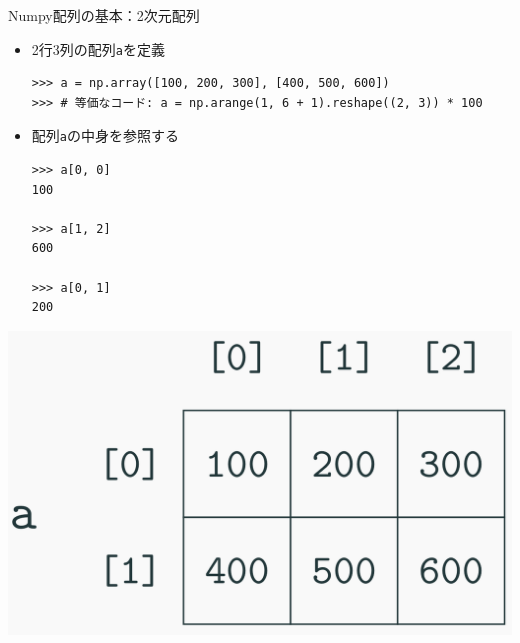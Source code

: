 \documentclass[10pt]{beamer}
\begin{document}
    \begin{frame}[fragile]{Numpy配列の基本：2次元配列}
        \begin{itemize}
            \item 2行3列の配列\texttt{a}を定義
                \begin{verbatim}
>>> a = np.array([100, 200, 300], [400, 500, 600])
>>> # 等価なコード: a = np.arange(1, 6 + 1).reshape((2, 3)) * 100
                \end{verbatim}
            \item 配列\texttt{a}の中身を参照する
                \begin{verbatim}
>>> a[0, 0]
100

>>> a[1, 2]
600

>>> a[0, 1]
200
                \end{verbatim}
	    \end{itemize}
	    \begin{center}
	        \includegraphics[width=0.35\hsize]{figs/numpy3.png}
	    \end{center}
	\end{frame}
    
\end{document}
